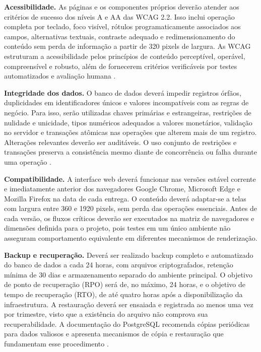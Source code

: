 \textbf{Acessibilidade.} As páginas e os componentes próprios deverão atender aos critérios de sucesso dos níveis A e AA das WCAG 2.2. Isso inclui operação completa por teclado, foco visível, rótulos programaticamente associados aos campos, alternativas textuais, contraste adequado e redimensionamento do conteúdo sem perda de informação a partir de 320 pixels de largura. As WCAG estruturam a acessibilidade pelos princípios de conteúdo perceptível, operável, compreensível e robusto, além de fornecerem critérios verificáveis por testes automatizados e avaliação humana \parencite{W3CWCAG22_2024}.

\textbf{Integridade dos dados.} O banco de dados deverá impedir registros órfãos, duplicidades em identificadores únicos e valores incompatíveis com as regras de negócio. Para isso, serão utilizadas chaves primárias e estrangeiras, restrições de nulidade e unicidade, tipos numéricos adequados a valores monetários, validação no servidor e transações atômicas nas operações que alterem mais de um registro. Alterações relevantes deverão ser auditáveis. O uso conjunto de restrições e transações preserva a consistência mesmo diante de concorrência ou falha durante uma operação \parencite{Silberschatz2012}.

\textbf{Compatibilidade.} A interface web deverá funcionar nas versões estável corrente e imediatamente anterior dos navegadores Google Chrome, Microsoft Edge e Mozilla Firefox na data de cada entrega. O conteúdo deverá adaptar-se a telas com largura entre 360 e 1920 pixels, sem perda das operações essenciais. Antes de cada versão, os fluxos críticos deverão ser executados na matriz de navegadores e dimensões definida para o projeto, pois testes em um único ambiente não asseguram comportamento equivalente em diferentes mecanismos de renderização.

\textbf{Backup e recuperação.} Deverá ser realizado backup completo e automatizado do banco de dados a cada 24 horas, com arquivos criptografados, retenção mínima de 30 dias e armazenamento separado do ambiente principal. O objetivo de ponto de recuperação (RPO) será de, no máximo, 24 horas, e o objetivo de tempo de recuperação (RTO), de até quatro horas após a disponibilização da infraestrutura. A restauração deverá ser ensaiada e registrada ao menos uma vez por trimestre, visto que a existência do arquivo não comprova sua recuperabilidade. A documentação do PostgreSQL recomenda cópias periódicas para dados valiosos e apresenta mecanismos de cópia e restauração que fundamentam esse procedimento \parencite{PostgreSQL18Backup}.

